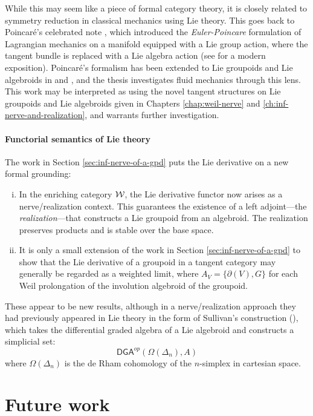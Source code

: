While this may seem like a piece of formal category theory, it is closely related to symmetry reduction in classical mechanics using Lie theory. This goes back to Poincar\'{e}'s celebrated note \cite{poincare1901}, which introduced the \emph{Euler-Poincare} formulation of Lagrangian mechanics on a manifold equipped with a Lie group action, where the tangent bundle is replaced with a Lie algebra action (see \cite{marle2013} for a modern exposition). Poincar\'{e}'s formalism has been extended to Lie groupoids and Lie algebroids in \cite{Weinstein1996} and \cite{Martinez2001}, and the thesis \cite{fusca2018} investigates fluid mechanics through this lens. This work may be interpreted as using the novel tangent structures on Lie groupoids and Lie algebroids given in Chapters \ref{chap:weil-nerve} and \ref{ch:inf-nerve-and-realization}, and warrants further investigation.

\paragraph{Functorial semantics of Lie theory}
The work in Section \ref{sec:inf-nerve-of-a-gpd} puts the Lie derivative on a new formal grounding:
\begin{enumerate}[(i)]
    \item In the enriching category ${\mathcal{W}}$, the Lie derivative functor now arises as a nerve/realization context. This guarantees the existence of a left adjoint---the \emph{realization}---that constructs a Lie groupoid from an algebroid. The realization preserves products and is stable over the base space.
    \item It is only a small extension of the work in Section \ref{sec:inf-nerve-of-a-gpd} to show that the Lie derivative of a groupoid in a tangent category may generally be regarded as a weighted limit, where $A_V = \{\partial(V), G\}$ for each Weil prolongation of the involution algebroid of the groupoid.
\end{enumerate}
These appear to be new results, although in a nerve/realization approach they had previously appeared in Lie theory in the form of Sullivan's construction (\cite{Sullivan1977}), which takes the differential graded algebra of a Lie algebroid and constructs a simplicial set:
\[
    \mathsf{DGA}^{op}(\Omega(\Delta_n), A)
\]
where $\Omega(\Delta_n)$ is the de Rham cohomology of the $n$-simplex in cartesian space.

\section{Future work}

